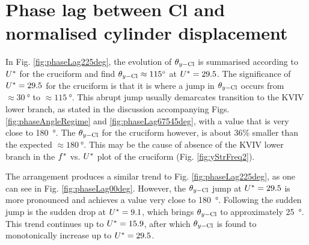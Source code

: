\documentclass[oneside]{utmthesis}
\begin{document}
\section{Phase lag between Cl and normalised cylinder displacement} \label{sec:phaseLag22500}
In Fig. \ref{fig:phaseLag225deg}, the evolution of $\theta_{y-\text{Cl}}$ is summarised according to $U^{*}$ for the \angtw{} cruciform and find $\plag \approx \SI{115}{\degree}$ at $U^{*} = 29.5$. The significance of $U^{*} = 29.5$ for the \angtw{} cruciform is that it is where a jump in $\theta_{y-\text{Cl}}$ occurs from $\approx \SI{30}{\degree}$ to $\approx \SI{115}{\degree}$. This abrupt jump usually demarcates transition to the KVIV lower branch, as stated in the discussion accompanying Figs. \ref{fig:phaseAngleRegime} and \ref{fig:phaseLag67545deg}, with a value that is very close to \SI{180}{\degree}. The $\theta_{y-\text{Cl}}$ for the \angtw{} cruciform however, is about 36\% smaller than the expected $\approx \SI{180}{\degree}$. This may be the cause of absence of the KVIV lower branch in the $f^{*}$ vs. $U^{*}$ plot of the \angtw{} cruciform (Fig. \ref{fig:yStrFreq2}).

The \angon{} arrangement produces a similar trend to Fig. \ref{fig:phaseLag225deg}, as one can see in Fig. \ref{fig:phaseLag00deg}. However, the $\theta_{y-\text{Cl}}$ jump at  $U^{*} =29.5$ is more pronounced and achieves a value very close to \SI{180}{\degree}. Following the sudden jump is the sudden drop at $U^{*} = 9.1$, which brings $\theta_{y-\text{Cl}}$ to approximately \SI{25}{\degree}. This trend continues up to $U^{*} = 15.9$, after which $\theta_{y-\text{Cl}}$ is found to monotonically increase up to $U^{*} = 29.5$.
\end{document}
